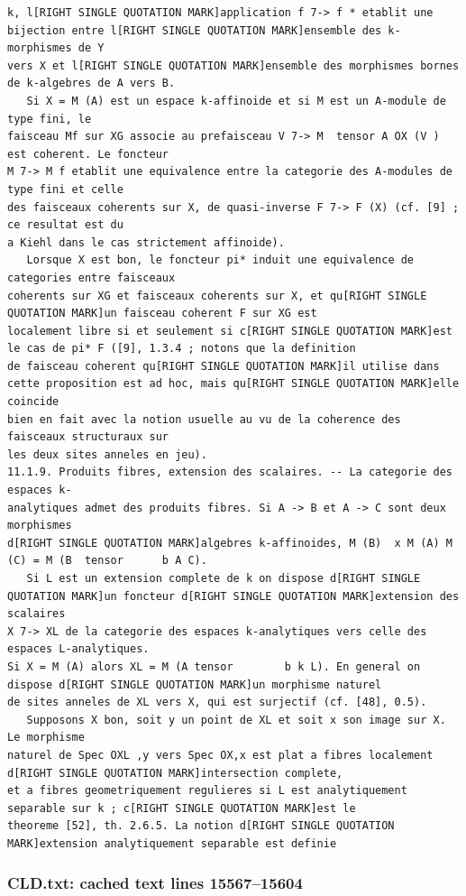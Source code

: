 \documentclass[
  11pt,
]{article}
\begin{document}
\begin{lstlisting}
k, l[RIGHT SINGLE QUOTATION MARK]application f 7-> f * etablit une bijection entre l[RIGHT SINGLE QUOTATION MARK]ensemble des k-morphismes de Y
vers X et l[RIGHT SINGLE QUOTATION MARK]ensemble des morphismes bornes de k-algebres de A vers B.
   Si X = M (A) est un espace k-affinoide et si M est un A-module de type fini, le
faisceau Mf sur XG associe au prefaisceau V 7-> M  tensor A OX (V ) est coherent. Le foncteur
M 7-> M f etablit une equivalence entre la categorie des A-modules de type fini et celle
des faisceaux coherents sur X, de quasi-inverse F 7-> F (X) (cf. [9] ; ce resultat est du
a Kiehl dans le cas strictement affinoide).
   Lorsque X est bon, le foncteur pi* induit une equivalence de categories entre faisceaux
coherents sur XG et faisceaux coherents sur X, et qu[RIGHT SINGLE QUOTATION MARK]un faisceau coherent F sur XG est
localement libre si et seulement si c[RIGHT SINGLE QUOTATION MARK]est le cas de pi* F ([9], 1.3.4 ; notons que la definition
de faisceau coherent qu[RIGHT SINGLE QUOTATION MARK]il utilise dans cette proposition est ad hoc, mais qu[RIGHT SINGLE QUOTATION MARK]elle coincide
bien en fait avec la notion usuelle au vu de la coherence des faisceaux structuraux sur
les deux sites anneles en jeu).
11.1.9. Produits fibres, extension des scalaires. -- La categorie des espaces k-
analytiques admet des produits fibres. Si A -> B et A -> C sont deux morphismes
d[RIGHT SINGLE QUOTATION MARK]algebres k-affinoides, M (B)  x M (A) M (C) = M (B  tensor      b A C).
   Si L est un extension complete de k on dispose d[RIGHT SINGLE QUOTATION MARK]un foncteur d[RIGHT SINGLE QUOTATION MARK]extension des scalaires
X 7-> XL de la categorie des espaces k-analytiques vers celle des espaces L-analytiques.
Si X = M (A) alors XL = M (A tensor        b k L). En general on dispose d[RIGHT SINGLE QUOTATION MARK]un morphisme naturel
de sites anneles de XL vers X, qui est surjectif (cf. [48], 0.5).
   Supposons X bon, soit y un point de XL et soit x son image sur X. Le morphisme
naturel de Spec OXL ,y vers Spec OX,x est plat a fibres localement d[RIGHT SINGLE QUOTATION MARK]intersection complete,
et a fibres geometriquement regulieres si L est analytiquement separable sur k ; c[RIGHT SINGLE QUOTATION MARK]est le
theoreme [52], th. 2.6.5. La notion d[RIGHT SINGLE QUOTATION MARK]extension analytiquement separable est definie
\end{lstlisting}

\subsubsection{CLD.txt: cached text lines
15567--15604}\label{cld.txt-cached-text-lines-1556715604}
\end{document}
